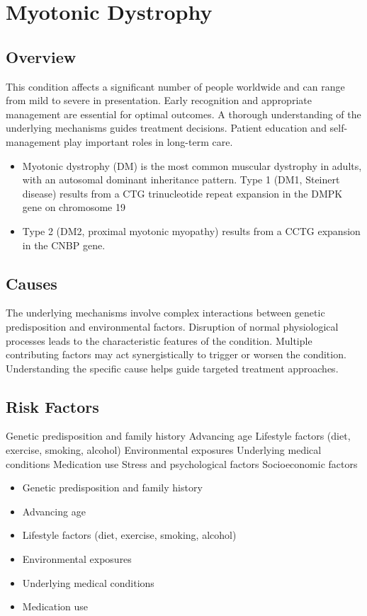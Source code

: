 \chapter{Myotonic Dystrophy}
\label{sec:Myotonic Dystrophy}

\section{Overview}
This condition affects a significant number of people worldwide and can range from mild to severe in presentation. Early recognition and appropriate management are essential for optimal outcomes. A thorough understanding of the underlying mechanisms guides treatment decisions. Patient education and self-management play important roles in long-term care.

\begin{itemize}[noitemsep]
  \item Myotonic dystrophy (DM) is the most common muscular dystrophy in adults, with an autosomal dominant inheritance pattern. Type 1 (DM1, Steinert disease) results from a CTG trinucleotide repeat expansion in the DMPK gene on chromosome 19
  \item Type 2 (DM2, proximal myotonic myopathy) results from a CCTG expansion in the CNBP gene.
\end{itemize}
\section{Causes}
The underlying mechanisms involve complex interactions between genetic predisposition and environmental factors. Disruption of normal physiological processes leads to the characteristic features of the condition. Multiple contributing factors may act synergistically to trigger or worsen the condition. Understanding the specific cause helps guide targeted treatment approaches.
\section{Risk Factors}
Genetic predisposition and family history Advancing age Lifestyle factors (diet, exercise, smoking, alcohol) Environmental exposures Underlying medical conditions Medication use Stress and psychological factors Socioeconomic factors

\begin{itemize}[noitemsep]
  \item Genetic predisposition and family history
  \item Advancing age
  \item Lifestyle factors (diet, exercise, smoking, alcohol)
  \item Environmental exposures
  \item Underlying medical conditions
  \item Medication use
\end{itemize}
